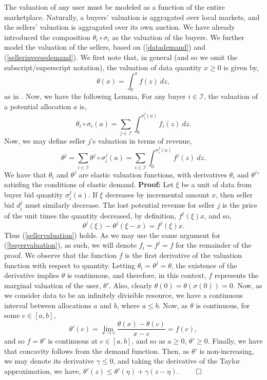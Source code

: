 \documentclass[sigconf, anonymous]{acmart}
\newcommand{\mcI}{\mathcal{I}}
\newcommand{\g}{\sigma}
\theoremstyle{definition}
\begin{document}
The valuation of any user must be modeled as a function of the entire
marketplace. 
Naturally, a buyers' valuation is aggragated over local markets, and the
sellers' valuation is aggragated over its own auction. We have already introduced the composition $\theta_i
\circ \g_i$ as the valuation of the buyers. We further model the valuation of the sellers, based on
(\ref{datademand}) and (\ref{sellerinversedemand}). We first note that, in
general (and so we omit the subscript/superscript notation), the valuation of data quantity $x\ge 0$ is given by,
$$
    \theta(x) = \int_0^x f(z) \ dz,
$$ 
as in \cite{semret}. Now, we have the following Lemma,
{
\label{uservaluation}
For any buyer $i\in\mcI$, the valuation of a potential
allocation $a$ is, 
\begin{equation}\label{buyervaluation}
    \theta_i \circ \g_i(a) = \displaystyle\sum_{j\in\mcI}
 \int_0^{\g_i^j(a)} f_i(z) \ dz.
\end{equation}
Now, we may define seller $j$'s valuation in terms of revenue,
\begin{equation}\label{sellervaluation}
    \theta^j= \displaystyle\sum_{i\in\mcI} \theta^j \circ \g_i^j(a) = \sum_{i\in\mcI}
 \int_0^{\g_i^j(a)} f^j(z) \ dz.
\end{equation}
We have that $\theta_i$ and $\theta^j$ are elastic valuation functions, with
derivatives
${\theta_i}$ and ${\theta^j}'$ satisfing the conditions of elastic demand.
}
\textbf{Proof:} 
Let $\xi$
be a unit of data from buyer bid quantity $\g_i^j(a)$.
If $\xi$ decreases by incremental amount $x$, then seller bid $d_i^j$ must
similarly decrease. The lost potential revenue for seller $j$ is the price of
the unit times the quantity decreased, by definition, $f^j(\xi)x$, and so,
$$
    \theta^j(\xi) - \theta^j(\xi-x) = f^j(\xi)x.
$$
Thus (\ref{sellervaluation}) holds.
As we may use the same argument for (\ref{buyervaluation}), as such, we will
denote $f_i=f^j=f$ for the remainder of the proof. We observe that the function
$f$ is the first
derivative of the valuation function with respect to
quantity. Letting $\theta_i=\theta^j=\theta$, the existence of the derivative implies $\theta$ 
is continuous, and therefore, in this context, $f$ represents
the marginal valuation of the user, ${\theta}'$. Also, clearly
$\theta(0)=\theta(\sigma(0)) = 0$. Now, as we consider data to be an infinitely
divisible resource, we have a continuous interval between allocations $a$ and
$b$, where $a\le b$. Now, as $\theta$ is continuous, for some $c\in[a,b]$, 
$$
\theta'(c) = \lim_{x\to c}\frac{\theta(x) - \theta(c)}{x-c} = f(c),
$$
and so $f=\theta'$ is continuous at $c\in[a,b]$, and so as $a\ge 0$, 
$\theta'\ge 0$. Finally, we have that concavity follows from the demand
function. Then, as $\theta'$ is
non-increasing, we may denote its derivative $\gamma \le 0$,
and taking the derivative of the Taylor approximation, we have, $\theta'(z) \le
\theta'(\eta) + \gamma(z-\eta)$.
$\qed$
\end{document}
